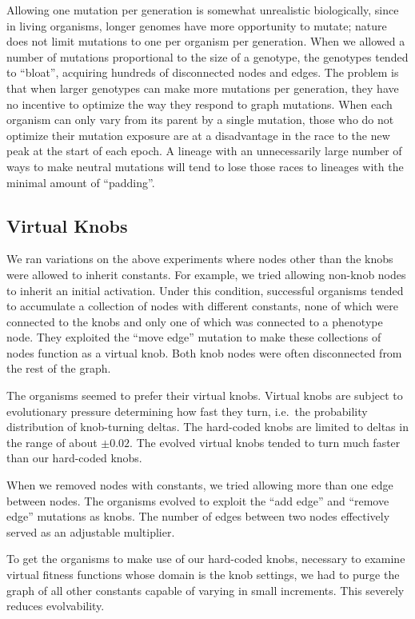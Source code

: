 \documentclass[letterpaper]{article}
\begin{document}
Allowing one mutation per generation is somewhat unrealistic biologically,
since in living organisms, longer genomes have more opportunity to mutate;
nature does not limit mutations to one per organism per generation. When we
allowed a number of mutations proportional to the size of a genotype, the
genotypes tended to ``bloat'', acquiring hundreds of disconnected nodes and
edges. The problem is that when larger genotypes can make more mutations per
generation, they have no incentive to optimize the way they respond to graph
mutations.  When each organism can only vary from its parent by a single
mutation, those who do not optimize their mutation exposure are at a
disadvantage in the race to the new peak at the start of each epoch. A lineage
with an unnecessarily large number of ways to make neutral mutations will tend
to lose those races to lineages with the minimal amount of ``padding''.

\subsection{Virtual Knobs}

We ran variations on the above experiments where nodes other than the knobs were
allowed to inherit constants. For example, we tried allowing non-knob nodes to
inherit an initial activation. Under this condition, successful organisms tended
to accumulate a collection of nodes with different constants, none of which were
connected to the knobs and only one of which was connected to a phenotype node.
They exploited the ``move edge'' mutation to make these collections of nodes
function as a virtual knob. Both knob nodes were often disconnected from the
rest of the graph.

The organisms seemed to prefer their virtual knobs. Virtual knobs are subject to
evolutionary pressure determining how fast they turn, i.e.~the probability
distribution of knob-turning deltas. The hard-coded knobs are limited to deltas
in the range of about $\pm0.02$. The evolved virtual knobs tended to turn much
faster than our hard-coded knobs.

When we removed nodes with constants, we tried allowing more than one edge
between nodes. The organisms evolved to exploit the ``add edge'' and ``remove
edge'' mutations as knobs. The number of edges between two nodes effectively
served as an adjustable multiplier.

To get the organisms to make use of our hard-coded knobs, necessary to examine
virtual fitness functions whose domain is the knob settings, we had to purge
the graph of all other constants capable of varying in small increments. This
severely reduces evolvability.
\end{document}
